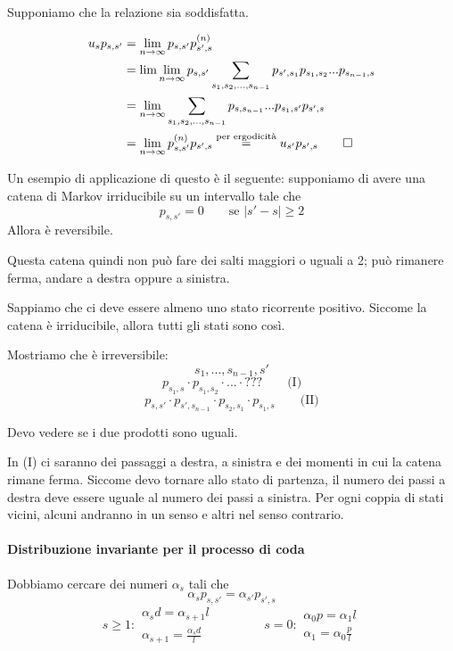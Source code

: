 \documentclass[a4paper,12pt]{book}
\newcommand\ddfrac[2]{\frac{\displaystyle #1}{\displaystyle #2}}
\begin{document}
Supponiamo che la relazione sia soddisfatta.

\begin{align*}
	u_s p_{s,s'} & = \lim\limits_{n \to \infty} p_{s,s'}p_{s',s}^{(n)} \\
	& = \lim\lim\limits_{n \to \infty} p_{s,s'} \sum_{s_1, s_2, ..., s_{n-1}} p_{s',s_1} p_{s_1, s_2} ... p_{s_{n-1}, s} \\
	& = \lim\limits_{n \to \infty} \sum_{s_1, s_2, ..., s_{n-1}} p_{s,s_{n-1}} ... p_{s_1, s'}p_{s',s} \\
	& = \lim\limits_{n \to \infty} p_{s,s'}^{(n)} p_{s',s} \overset{\text{per ergodicità}}{=} u_{s'} p_{s',s} \qed
\end{align*}

Un esempio di applicazione di questo è il seguente: supponiamo di avere una catena di Markov irriducibile su un intervallo tale che
$$ p_{s,s'} = 0 \qquad \text{se } | s' - s | \ge 2 $$
Allora è reversibile. 



Questa catena quindi non può fare dei salti maggiori o uguali a 2; può rimanere ferma, andare a destra oppure a sinistra. 

Sappiamo che ci deve essere almeno uno stato ricorrente positivo. Siccome la catena è irriducibile, allora tutti gli stati sono così. 

Mostriamo che è irreversibile:
$$ s_1, ..., s_{n-1}, s' $$
$$ p_{s_1, s} \cdot p_{s_1, s_2} \cdot ... \cdot ??? \qquad \text{(I)}$$ %
$$ p_{s,s'} \cdot p_{s', s_{n-1}} \cdot p_{s_2, s_1} \cdot p_{s_1, s} \qquad \text{(II)}$$

Devo vedere se i due prodotti sono uguali. 

In (I) ci saranno dei passaggi a destra, a sinistra e dei momenti in cui la catena rimane ferma. Siccome devo tornare allo stato di partenza, il numero dei passi a destra deve essere uguale al numero dei passi a sinistra. Per ogni coppia di stati vicini, alcuni andranno in un senso e altri nel senso contrario. 


\paragraph{Distribuzione invariante per il processo di coda} Dobbiamo cercare dei numeri $ \alpha_s $ tali che 
$$ \alpha_{s}p_{s,s'} = \alpha_{s'}p_{s',s} $$
$$ s \ge 1: \begin{array}{c}
	\alpha_{s}d = \alpha_{s+1}l \\
	\alpha_{s+1} = \ddfrac{\alpha_{s}d}{l}
\end{array} \qquad \qquad s = 0: \begin{array}{c}
	\alpha_{0}p = \alpha_{1} l \\
	\alpha_{1} = \alpha_{0}\ddfrac{p}{l}
\end {array} $$
\end{document}
